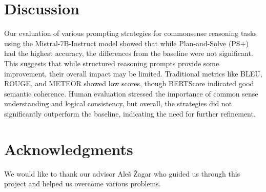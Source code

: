\documentclass[fleqn,moreauthors,10pt]{ds_report}
\begin{document}

\section*{Discussion}
Our evaluation of various prompting strategies for commonsense reasoning tasks using the Mistral-7B-Instruct model showed that while Plan-and-Solve (PS+) had the highest accuracy, the differences from the baseline were not significant. This suggests that while structured reasoning prompts provide some improvement, their overall impact may be limited. Traditional metrics like BLEU, ROUGE, and METEOR showed low scores, though BERTScore indicated good semantic coherence. Human evaluation stressed the importance of common sense understanding and logical consistency, but overall, the strategies did not significantly outperform the baseline, indicating the need for further refinement.


\section*{Acknowledgments}

We would like to thank our advisor Aleš Žagar who guided us through this project and helped us overcome various problems.




\end{document}

